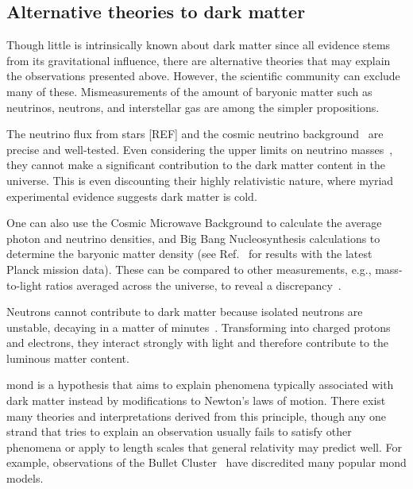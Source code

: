 

\subsection{Alternative theories to dark matter}
\label{subsec:intro_alternative_dm_theories}

Though little is intrinsically known about dark matter since all evidence stems from its gravitational influence, there are alternative theories that may explain the observations presented above. However, the scientific community can exclude many of these. Mismeasurements of the amount of baryonic matter such as neutrinos, neutrons, and interstellar gas are among the simpler propositions.

The neutrino flux from stars [REF] and the cosmic neutrino background~\cite{weinberg2008cosmology} are precise and well-tested. Even considering the upper limits on neutrino masses~\cite{Mertens:2016ihw}, they cannot make a significant contribution to the dark matter content in the universe. This is even discounting their highly relativistic nature, where myriad experimental evidence suggests dark matter is cold.

One can also use the Cosmic Microwave Background to calculate the average photon and neutrino densities, and Big Bang Nucleosynthesis calculations to determine the baryonic matter density (see Ref.~ for results with the latest Planck mission data). These can be compared to other measurements, e.g., mass-to-light ratios averaged across the universe, to reveal a discrepancy~\cite{cox2016universal}.

Neutrons cannot contribute to dark matter because isolated neutrons are unstable, decaying in a matter of minutes~\cite{PhysRevD.98.030001}. Transforming into charged protons and electrons, they interact strongly with light and therefore contribute to the luminous matter content.

\Gls{mond} is a hypothesis that aims to explain phenomena typically associated with dark matter instead by modifications to Newton's laws of motion. There exist many theories and interpretations derived from this principle, though any one strand that tries to explain an observation usually fails to satisfy other phenomena or apply to length scales that general relativity may predict well. For example, observations of the Bullet Cluster~\cite{BulletClusterDMevidence} have discredited many popular \acrshort{mond} models.


